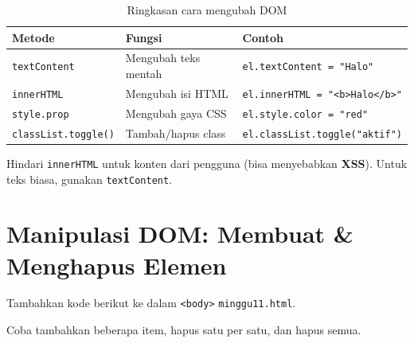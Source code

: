 \begin{table}[htbp]
\centering
\caption{Ringkasan cara mengubah DOM}
\label{tab:11-cara-dom}
\begin{tabular}{lll}
\toprule
\textbf{Metode} & \textbf{Fungsi} & \textbf{Contoh} \\
\midrule
\texttt{textContent} & Mengubah teks mentah & \texttt{el.textContent = "Halo"} \\
\texttt{innerHTML} & Mengubah isi HTML & \texttt{el.innerHTML = "<b>Halo</b>"} \\
\texttt{style.prop} & Mengubah gaya CSS & \texttt{el.style.color = "red"} \\
\texttt{classList.toggle()} & Tambah/hapus class & \texttt{el.classList.toggle("aktif")} \\
\bottomrule
\end{tabular}
\end{table}

\begin{peringatan}
Hindari \texttt{innerHTML} untuk konten dari pengguna (bisa menyebabkan \textbf{XSS}). Untuk teks biasa, gunakan \texttt{textContent}.
\end{peringatan}

\section{Manipulasi DOM: Membuat \& Menghapus Elemen}
\label{sec:11-manipulasi-elemen}

\begin{langkah}
  \item Tambahkan kode berikut ke dalam \texttt{<body>} \texttt{minggu11.html}.
  \item Coba tambahkan beberapa item, hapus satu per satu, dan hapus semua.
\end{langkah}

